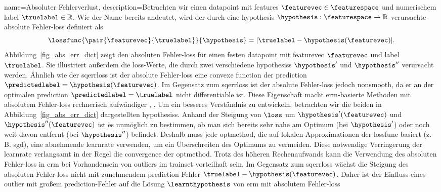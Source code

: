 {{{{
{name={Absoluter Fehlerverlust},
	description={Betrachten wir einen \gls{datapoint} mit \glspl{feature} 
	$\featurevec \in \featurespace$ und numerischem \gls{label} $\truelabel \in \mathbb{R}$. 
	Wie der Name bereits andeutet, wird der durch eine \gls{hypothesis} 
	$\hypothesis: \featurespace \rightarrow \mathbb{R}$ verursachte absolute Fehler-\gls{loss} 
	definiert als 
	$$\lossfunc{\pair{\featurevec}{\truelabel}}{\hypothesis} = |\truelabel - \hypothesis(\featurevec)|.$$
	Abbildung~\ref{fig_abs_err_dict} zeigt den absoluten Fehler-\gls{loss} für einen festen \gls{datapoint} 
	mit \gls{featurevec} $\featurevec$ und \gls{label} $\truelabel$. Sie illustriert außerdem die \gls{loss}-Werte, 
	die durch zwei verschiedene \glspl{hypothesis} $\hypothesis'$ und $\hypothesis''$ verursacht werden. 
	Ähnlich wie der \gls{sqerrloss} ist der absolute Fehler-\gls{loss} eine \gls{convex}e \gls{function} 
	der \gls{prediction} $\predictedlabel=\hypothesis(\featurevec)$. 
	Im Gegensatz zum \gls{sqerrloss} ist der absolute Fehler-\gls{loss} jedoch \gls{nonsmooth}, 
	da er an der optimalen \gls{prediction} $\predictedlabel=\truelabel$ nicht \gls{differentiable} ist. 
	Diese Eigenschaft macht \gls{erm}-basierte Methoden mit absolutem Fehler-\gls{loss} 
	rechnerisch aufwändiger \cite{nesterov04}, \cite{OptMLBook}. 
	Um ein besseres Verständnis zu entwickeln, betrachten wir die beiden in Abbildung~\ref{fig_abs_err_dict} dargestellten \glspl{hypothesis}. 
	Anhand der Steigung von $\loss$ um $\hypothesis'(\featurevec)$ und $\hypothesis''(\featurevec)$ 
	ist es unmöglich zu bestimmen, ob man sich bereits sehr nahe am Optimum (bei $\hypothesis'$) oder noch weit davon entfernt (bei $\hypothesis''$) befindet. 
	Deshalb muss jede \gls{optmethod}, die auf lokalen Approximationen der \gls{lossfunc} basiert (z.\,B. \gls{sgd}), 
	eine abnehmende \gls{learnrate} verwenden, um ein Überschreiten des Optimums zu vermeiden. 
	Diese notwendige Verringerung der \gls{learnrate} verlangsamt in der Regel die \gls{convergence} der \gls{optmethod}. 
	Trotz des höheren Rechenaufwands kann die Verwendung des absoluten Fehler-\gls{loss} in \gls{erm} 
	bei Vorhandensein von \glspl{outlier} im \gls{trainset} vorteilhaft sein. 
	Im Gegensatz zum \gls{sqerrloss} wächst die Steigung des absoluten Fehler-\gls{loss} 
	nicht mit zunehmendem \gls{prediction}-Fehler $\truelabel - \hypothesis(\featurevec)$. 
	Daher ist der Einfluss eines \gls{outlier} mit großem \gls{prediction}-Fehler 
	auf die Lösung $\learnthypothesis$ von \gls{erm} mit absolutem Fehler-\gls{loss} 
}}}}}}
